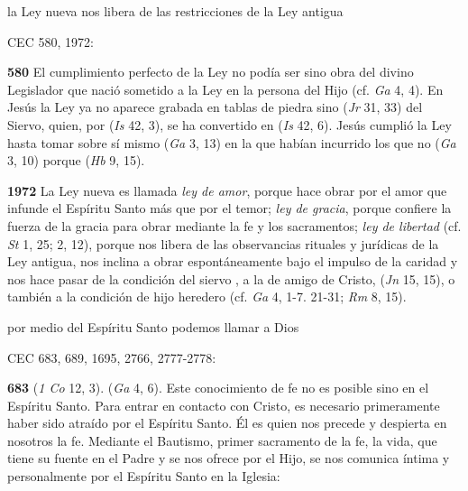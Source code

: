 \begin{body}
\begin{body}
la Ley nueva nos libera de las restricciones de la Ley antigua

CEC 580, 1972:

\textbf{580} El cumplimiento perfecto de la Ley no podía ser sino obra del divino Legislador que nació sometido a la Ley en la persona del Hijo (cf. \emph{Ga} 4, 4). En Jesús la Ley ya no aparece grabada en tablas de piedra sino  (\emph{Jr} 31, 33) del Siervo, quien, por  (\emph{Is} 42, 3), se ha convertido en  (\emph{Is} 42, 6). Jesús cumplió la Ley hasta tomar sobre sí mismo  (\emph{Ga} 3, 13) en la que habían incurrido los que no  (\emph{Ga} 3, 10) porque  (\emph{Hb} 9, 15).

\textbf{1972} La Ley nueva es llamada \emph{ley de amor}, porque hace obrar por el amor que infunde el Espíritu Santo más que por el temor; \emph{ley de gracia}, porque confiere la fuerza de la gracia para obrar mediante la fe y los sacramentos; \emph{ley de libertad} (cf. \emph{St} 1, 25; 2, 12), porque nos libera de las observancias rituales y jurídicas de la Ley antigua, nos inclina a obrar espontáneamente bajo el impulso de la caridad y nos hace pasar de la condición del siervo , a la de amigo de Cristo,  (\emph{Jn} 15, 15), o también a la condición de hijo heredero (cf. \emph{Ga} 4, 1-7. 21-31; \emph{Rm} 8, 15).

por medio del Espíritu Santo podemos llamar a Dios 

CEC 683, 689, 1695, 2766, 2777-2778:

\textbf{683}  (\emph{1 Co} 12, 3).  (\emph{Ga} 4, 6). Este conocimiento de fe no es posible sino en el Espíritu Santo. Para entrar en contacto con Cristo, es necesario primeramente haber sido atraído por el Espíritu Santo. Él es quien nos precede y despierta en nosotros la fe. Mediante el Bautismo, primer sacramento de la fe, la vida, que tiene su fuente en el Padre y se nos ofrece por el Hijo, se nos comunica íntima y personalmente por el Espíritu Santo en la Iglesia:


\end{body}
\end{body}
